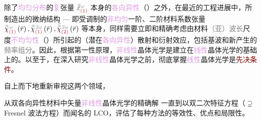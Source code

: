 除了\textcolor{Plum}{均匀分布}的\textcolor{Plum}{复}张量 $\bar{\bar{\varepsilon}}^{\;\! \mathcolor{gray}{\omega}}_{\textcolor{Maroon}{(1)}}$ 本身的\textcolor{Plum}{各向异性}（）之外，在最近的工程进展中，所制造出的微纳结构 --- 即受调制的\textcolor{Plum}{非均匀}一阶、二阶材料系数张量 $\bar{\bar{\chi}}^{\;\! \mathcolor{gray}{\omega}}_{ \textcolor{Maroon}{(1)}} \left( \bar{r} \right),\bar{\bar{\chi}}^{\;\! \mathcolor{gray}{2\omega}}_{ \textcolor{Maroon}{(1)}} \left( \bar{r} \right),\bar{\bar{\bar{\chi}}}^{\;\! \mathcolor{gray}{2\omega}}_{ \textcolor{Maroon}{(2)}} \left( \bar{r} \right)$ 等本身\cite{xuFemtosecondLaserWriting2022,weiExperimentalDemonstrationThreedimensional2018,xuThreedimensionalNonlinearPhotonic2018,keren-zurNewDimensionNonlinear2018}，同样需要立即和精确考虑由材料\textcolor{gray}{（亚）波长}尺度\textcolor{Plum}{不均匀性}（）所引起的（潜在\textcolor{Plum}{各向异性}）散射和衍射效应\cite{chenQuasiphasematchingdivisionMultiplexingHolography2021b,chenLaserNanoprinting3D2023,sunFerroelectricTopologiesBaTiO32025,xuLargeFieldofviewNonlinear2024}，包括\textcolor{PineGreen}{基波}和新产生的\textcolor{gray}{频率组分}\cite{chenQuasiphasematchingdivisionMultiplexingHolography2021b,chenLaserNanoprinting3D2023}。因此，根据\textcolor{NavyBlue}{第一性原理}，\textcolor{Plum}{非线性}\textcolor{PineGreen}{晶体光学}是建立在\textcolor{Plum}{线性}\textcolor{PineGreen}{晶体光学}的基础上的。以至于，在深入研究\textcolor{Plum}{非线性}\textcolor{PineGreen}{晶体光学}之前，彻底掌握\textcolor{Plum}{线性}\textcolor{PineGreen}{晶体光学}是\textcolor{Maroon}{先决条件}。

自上而下地重新审视这两个领域，

从\textcolor{PineGreen}{双各向异性}材料中矢量\textcolor{Plum}{非线性}\textcolor{PineGreen}{晶体光学}的精确解  一直到以双二次特征方程（$\supsetneq$ Fresnel 波法方程）而闻名的 LCO，评估了每种方法的等效性、优点和局限性。

